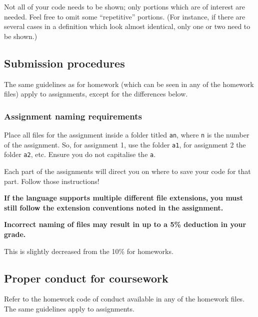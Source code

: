 \documentclass[11pt]{article}
\begin{document}
Not all of your code needs to be shown;
only portions which are of interest are needed.
Feel free to omit some “repetitive” portions.
(For instance, if there are several cases in a definition
which look almost identical, only one or two need to be shown.)

\subsection*{Submission procedures}
\label{sec:org89a8de0}
The same guidelines as for homework
(which can be seen in any of the homework files)
apply to assignments, except for the differences below.

\subsubsection*{Assignment naming requirements}
\label{sec:orgb23a2a9}

Place all files for the assignment
inside a folder titled \texttt{an}, where \texttt{n} is the number of the assignment.
So, for assignment 1, use the folder \texttt{a1}, for assignment 2 the folder \texttt{a2}, etc.
Ensure you do not capitalise the \texttt{a}.

Each part of the assignments will direct you on where to
save your code for that part. Follow those instructions!

\begin{center}
\textbf{If the language supports multiple different file extensions,}
\textbf{you must still follow the extension conventions noted in the assignment.}
\end{center}

\begin{center}
\textbf{Incorrect naming of files may result in up to a 5\% deduction in your grade.}
\end{center}
This is slightly decreased from the 10\% for homeworks.

\subsection*{Proper conduct for coursework}
\label{sec:org75d2837}
Refer to the homework code of conduct available in any of the homework files.
The same guidelines apply to assignments.
\end{document}
